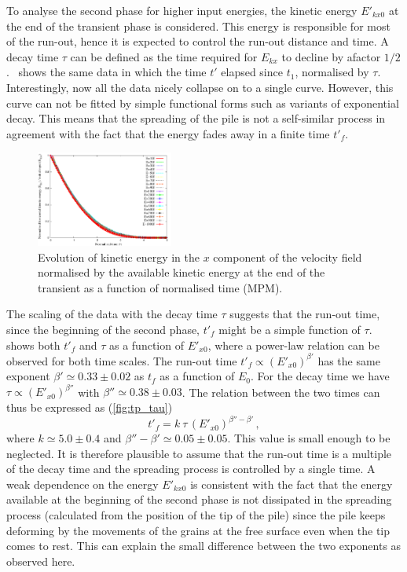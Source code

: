 \documentclass[3p,times,procedia,number]{elsarticle}
\begin{document}
To analyse the second phase for higher input energies, the kinetic energy
$E'_{kx0}$ at the end of the transient phase is considered. This energy is
responsible for most of the run-out, hence it is expected to control the
run-out distance and time. A decay time $\tau$ can be defined as the time
required for $E_{kx}$ to decline by afactor $1/2$.~
shows the same data in which the time $t'$ elapsed since $t_1$, normalised by
$\tau$. Interestingly, now all the data nicely collapse on to a single curve.
However, this curve can not be fitted by simple functional forms such as
variants of exponential decay. This means that the spreading of the pile is not
a self-similar process in agreement with the fact that the energy fades away in
a finite time $t'_f$. 

\begin{figure}[tbhp]
  \centering
  \includegraphics[width=0.4\textwidth]{figs/EkxKoTTau_Slope}
  \caption[Evolution of the normalised horizontal kinetic energy as function of 
  the normalised time since the transient phase.]{Evolution of kinetic energy in 
  the $x$ component of the velocity field  normalised by the available kinetic
  energy at the end of the transient as a function of normalised time (MPM).}
  \label{fig:ExEx0_vs_ttau}
\end{figure}


The scaling of the data with the decay time $\tau$ suggests that the 
run-out time, since the beginning of the second phase, $t'_f$ might be a simple 
function of $\tau$.~ shows both $t'_f$ and $\tau$ as 
a function of $E'_{x0}$, where a power-law relation can be observed for both 
time scales. The run-out time $t'_f \propto (E'_{x0})^{\beta'}$ has the 
same exponent $\beta' \simeq 0.33 \pm 0.02$ as $t_f$ as a function of $E_0$. 
For the decay time we have $\tau \propto (E'_{x0})^{\beta''}$ with $\beta'' 
\simeq 0.38 \pm 0.03$. The relation between the two times can thus be expressed 
as (\cref{fig:tp_tau})
\begin{equation}
  t'_f = k  \ \tau \, (E'_{x0})^{\beta'' - \beta'} \,,
  \label{eqn:t'f}
\end{equation}
where $k \simeq 5.0 \pm 0.4$ and $\beta'' - \beta' \simeq 0.05 \pm 0.05$. This 
value is small enough to be neglected. It is therefore plausible to assume that 
the run-out time is a multiple of the decay time and the spreading process is 
controlled by a single time. A weak dependence on the energy $E'_{kx0}$ is 
consistent with the fact that the energy available at the beginning of the 
second phase is not dissipated in the spreading process (calculated from the 
position of the tip of the pile) since the pile keeps deforming by the 
movements of the grains at the free surface even when the tip comes to rest. 
This can explain the small difference between the two exponents as observed 
here.
\end{document}
